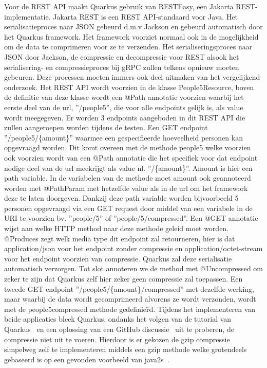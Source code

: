 Voor de REST API maakt Quarkus gebruik van RESTEasy, een Jakarta REST-implementatie. Jakarta REST is een REST API-standaard voor Java.
Het serialisatieproces naar JSON gebeurd d.m.v Jackson en gebeurd automatisch door het Quarkus framework.
Het framework voorziet normaal ook in de mogelijkheid om de data te comprimeren voor ze te verzenden.
Het serialiseringsproces naar JSON door Jackson, de compressie en decompressie voor REST alsook het serialisering- en compressieproces bij gRPC zullen telkens opnieuw moeten gebeuren.
Deze processen moeten immers ook deel uitmaken van het vergelijkend onderzoek.
Het REST API wordt voorzien in de klasse People5Resource, boven de definitie van deze klasse wordt een @Path annotatie voorzien waarbij
het eerste deel van de url, ''/people5'', die voor alle endpoints gelijk is, als value wordt meegegeven.
Er worden 3 endpoints aangeboden in dit REST API die zullen aangeroepen worden tijdens de testen. Een GET endpoint ''/people5/\{amount\}'' waarmee een gespecifieerde hoeveelheid
personen kan opgevraagd worden. Dit komt overeen met de methode people5 welke voorzien ook voorzien wordt van een @Path annotatie
die het specifiek voor dat endpoint nodige deel van de url meekrijgt als value nl. ''/\{amount\}''. Amount is hier een path variable. In de variabelen van
de methode moet amount ook geannoteerd worden met @PathParam met hetzelfde value als in de url om het framework deze te laten doorgeven.
Dankzij deze path variable worden bijvoorbeeld 5 personen opgevraagd via een GET request door middel van een variabele in de URI te voorzien bv.
''people/5'' of ''people/5/compressed''.
Een @GET annotatie wijst aan welke HTTP method naar deze methode geleid moet worden. @Produces zegt welk media type dit endpoint zal retourneren, hier is dat application/json
voor het endpoint zonder compressie en application/octet-stream voor het endpoint voorzien van compressie.
Quarkus zal deze serialisatie automatisch verzorgen. Tot slot annoteren we de method met @Uncompressed om zeker te zijn dat Quarkus zelf hier zeker geen compressie zal toepassen.
Een tweede GET endpoint ''/people5/\{amount\}/compressed'' met dezelfde werking, maar waarbij de data wordt gecomprimeerd alvorens ze wordt verzonden,
wordt met de people5compressed methode gedefinie\"rd. Tijdens het implementeren van beide applicaties bleek Quarkus, ondanks het volgen van de tutorial van Quarkus~\parencite{quarkusgzipcompressie}
en een oplossing van een GitHub discussie~\parencite{quarkusgzipcompressiegithub} uit te proberen, de compressie niet uit te voeren.
Hierdoor is er gekozen de gzip compressie simpelweg zelf te implementeren middels een gzip methode welke grotendeels gebaseerd is op een gevonden voorbeeld van java2s~\parencite{gzipCompressie}.
